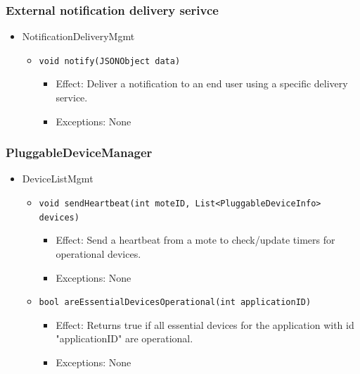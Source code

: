     \subsubsection{External notification delivery serivce}
        \begin{itemize}
            \item NotificationDeliveryMgmt
            \begin{itemize}
                \item \texttt{void notify(JSONObject data)}
                \begin{itemize}
                    \item Effect: Deliver a notification to an end user using a specific delivery service.
                    \item Exceptions: None
                \end{itemize}
            \end{itemize}
        \end{itemize}

    \subsubsection{PluggableDeviceManager}
        \begin{itemize}
        	\item DeviceListMgmt
        	\begin{itemize}
        		\item \texttt{void sendHeartbeat(int moteID, List<PluggableDeviceInfo> devices)}
        		\begin{itemize}
        			\item Effect: Send a heartbeat from a mote to check/update timers for operational devices.
        			\item Exceptions: None
        		\end{itemize}
        		\item \texttt{bool areEssentialDevicesOperational(int applicationID)}
        		\begin{itemize}
        			\item Effect: Returns true if all essential devices for the application
                                  with id "applicationID" are operational.
        			\item Exceptions: None
        		\end{itemize}
        	\end{itemize}
        \end{itemize}


